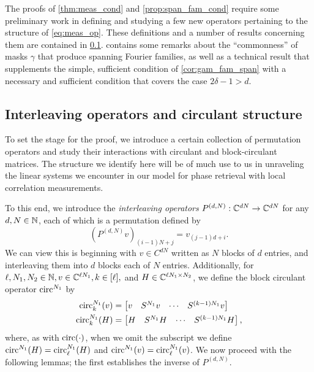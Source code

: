 The proofs of \cref{thm:meas_cond} and \cref{prop:span_fam_cond} require some preliminary work in defining and studying a few new operators pertaining to the structure of \eqref{eq:meas_op}.  These definitions and a number of results concerning them are contained in \cref{sec:interlemma}.   contains some remarks about the ``commonness'' of masks $\gamma$ that produce spanning Fourier families, as well as a technical result that supplements the simple, sufficient condition of \cref{cor:gam_fam_span} with a necessary and sufficient condition that covers the case $2 \delta - 1 > d$.

\subsection{Interleaving operators and circulant structure}
\label{sec:interlemma}

To set the stage for the proof, we introduce a certain collection of permutation operators and study their interactions with circulant and block-circulant matrices.  The structure we identify here will be of much use to us in unraveling the linear systems we encounter in our model for phase retrieval with local correlation measurements.

To this end, we introduce the \emph{interleaving operators} $P^{(d, N)} : \mathbb{C}^{dN} \to \mathbb{C}^{dN}$ for any $d, N \in \mathbb{N}$, each of which is a permutation defined by \begin{equation} (P^{(d, N)} v)_{(i - 1)N + j} = v_{(j - 1)d + i}.\label{eq:interleave_def}\end{equation}  We can view this is beginning with $v \in C^{dN}$ written as $N$ blocks of $d$ entries, and interleaving them into $d$ blocks each of $N$ entries.  Additionally, for $\ell, N_1, N_2 \in \mathbb{N}, v \in \mathbb{C}^{\ell N_1}, k \in [\ell],$ and $H \in \mathbb{C}^{\ell N_1 \times N_2}$, we define the block circulant operator $\operatorname{circ}^{N_1}$ by
\begin{align*}
  \operatorname{circ}_k^{N_1}(v) &= \begin{bmatrix} v & S^{N_1} v & \cdots & S^{(k - 1)N_1} v \end{bmatrix} \\
  \operatorname{circ}_k^{N_1}(H) &= \begin{bmatrix} H & S^{N_1} H & \cdots & S^{(k - 1) N_1}H \end{bmatrix},
\end{align*}
where, as with $\operatorname{circ}(\cdot)$, when we omit the subscript we define $\operatorname{circ}^{N_1}(H) = \operatorname{circ}_\ell^{N_1}(H)$ and $\operatorname{circ}^{N_1}(v) = \operatorname{circ}_\ell^{N_1}(v)$.  We now proceed with the following lemmas; the first establishes the inverse of $P^{(d, N)}$.

